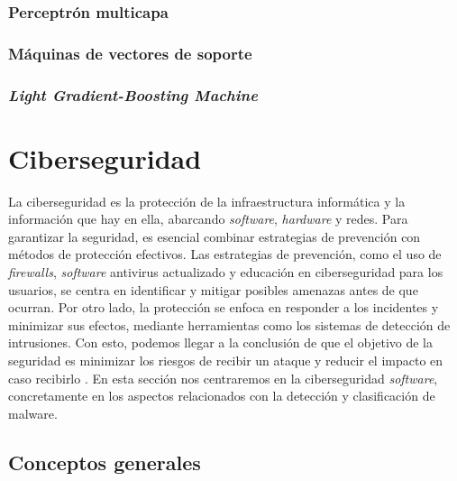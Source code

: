 
\subsubsection{Perceptrón multicapa}
\label{subsubsec:mlp}


\subsubsection{Máquinas de vectores de soporte}
\label{subsubsec:svm}


\subsubsection{\textit{Light Gradient-Boosting Machine}}
\label{subsubsec:lgbm}


\section{Ciberseguridad}
\label{sec:ciberseguridad}

La ciberseguridad es la protección de la infraestructura informática y la información que hay en ella, abarcando \textit{software}, \textit{hardware} y redes. Para garantizar la seguridad, es esencial combinar estrategias de prevención con métodos de protección efectivos. Las estrategias de prevención, como el uso de \textit{firewalls}, \textit{software} antivirus actualizado y educación en ciberseguridad para los usuarios, se centra en identificar y mitigar posibles amenazas antes de que ocurran. Por otro lado, la protección se enfoca en responder a los incidentes y minimizar sus efectos, mediante herramientas como los sistemas de detección de intrusiones. Con esto, podemos llegar a la conclusión de que el objetivo de la seguridad es minimizar los riesgos de recibir un ataque y reducir el impacto en caso recibirlo \cite{ciberseguridad_def}. En esta sección nos centraremos en la ciberseguridad \textit{software}, concretamente en los aspectos relacionados con la detección y clasificación de malware.

\subsection{Conceptos generales}
\label{subsec:ciberseguridad_general}

